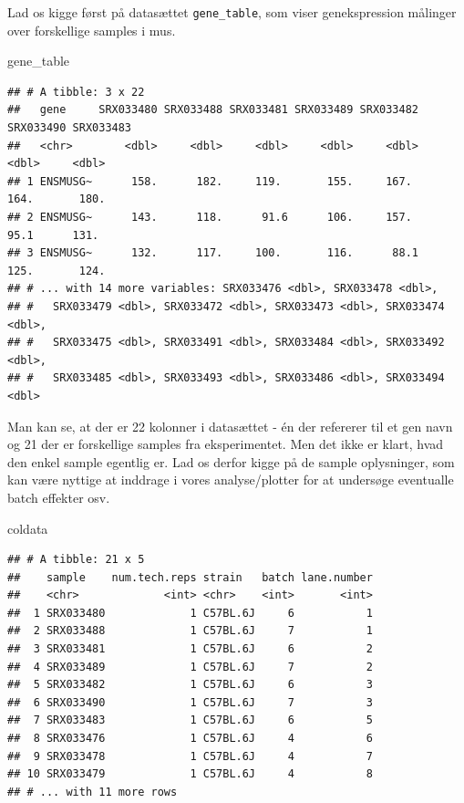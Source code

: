 \documentclass[
]{book}
\newenvironment{Shaded}{\begin{snugshade}}{\end{snugshade}}
\newcommand{\NormalTok}[1]{#1}
\begin{document}
Lad os kigge først på datasættet \texttt{gene\_table}, som viser genekspression målinger over forskellige samples i mus.

\begin{Shaded}
\begin{Highlighting}[]
\NormalTok{gene\_table}
\end{Highlighting}
\end{Shaded}

\begin{verbatim}
## # A tibble: 3 x 22
##   gene     SRX033480 SRX033488 SRX033481 SRX033489 SRX033482 SRX033490 SRX033483
##   <chr>        <dbl>     <dbl>     <dbl>     <dbl>     <dbl>     <dbl>     <dbl>
## 1 ENSMUSG~      158.      182.     119.       155.     167.      164.       180.
## 2 ENSMUSG~      143.      118.      91.6      106.     157.       95.1      131.
## 3 ENSMUSG~      132.      117.     100.       116.      88.1     125.       124.
## # ... with 14 more variables: SRX033476 <dbl>, SRX033478 <dbl>,
## #   SRX033479 <dbl>, SRX033472 <dbl>, SRX033473 <dbl>, SRX033474 <dbl>,
## #   SRX033475 <dbl>, SRX033491 <dbl>, SRX033484 <dbl>, SRX033492 <dbl>,
## #   SRX033485 <dbl>, SRX033493 <dbl>, SRX033486 <dbl>, SRX033494 <dbl>
\end{verbatim}

Man kan se, at der er 22 kolonner i datasættet - én der refererer til et gen navn og 21 der er forskellige samples fra eksperimentet. Men det ikke er klart, hvad den enkel sample egentlig er. Lad os derfor kigge på de sample oplysninger, som kan være nyttige at inddrage i vores analyse/plotter for at undersøge eventualle batch effekter osv.

\begin{Shaded}
\begin{Highlighting}[]
\NormalTok{coldata}
\end{Highlighting}
\end{Shaded}

\begin{verbatim}
## # A tibble: 21 x 5
##    sample    num.tech.reps strain   batch lane.number
##    <chr>             <int> <chr>    <int>       <int>
##  1 SRX033480             1 C57BL.6J     6           1
##  2 SRX033488             1 C57BL.6J     7           1
##  3 SRX033481             1 C57BL.6J     6           2
##  4 SRX033489             1 C57BL.6J     7           2
##  5 SRX033482             1 C57BL.6J     6           3
##  6 SRX033490             1 C57BL.6J     7           3
##  7 SRX033483             1 C57BL.6J     6           5
##  8 SRX033476             1 C57BL.6J     4           6
##  9 SRX033478             1 C57BL.6J     4           7
## 10 SRX033479             1 C57BL.6J     4           8
## # ... with 11 more rows
\end{verbatim}
\end{document}
